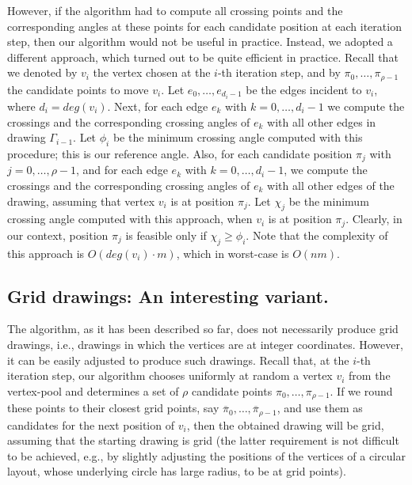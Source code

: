 \documentclass[runningheads]{llncs}
\begin{document}
However, if the algorithm had to compute all crossing points and the corresponding angles at these points for each candidate position at each iteration step, then our algorithm would not be useful in practice. Instead, we adopted a different approach, which turned out to be quite efficient in practice. Recall that we denoted by $v_i$ the vertex chosen at the $i$-th iteration step, and by $\pi_0,\ldots,\pi_{\rho-1}$ the candidate points to move $v_i$. Let $e_0,\ldots,e_{d_i-1}$ be the edges incident to $v_i$, where $d_i=deg(v_i)$. Next, for each edge $e_k$ with $k=0,\ldots,d_i-1$  we compute the crossings and the corresponding crossing angles of $e_k$ with all other edges in drawing $\Gamma_{i-1}$. Let $\phi_i$ be the minimum crossing angle computed with this procedure; this is our reference angle. Also, for each candidate position $\pi_j$ with $j=0,\ldots,\rho-1$, and for each edge $e_k$ with $k=0,\ldots,d_i-1$, we compute the crossings and the corresponding crossing angles of $e_k$ with all other edges of the drawing, assuming that vertex $v_i$ is at position $\pi_j$. Let $\chi_j$ be the minimum crossing angle computed with this approach, when $v_i$ is at position $\pi_j$. Clearly, in our context, position $\pi_j$ is feasible only if $\chi_j \geq \phi_i$. Note that the complexity of this approach is $O(deg(v_i) \cdot m)$, which in worst-case is $O(nm)$. 

\subsection{Grid drawings: An interesting variant.}
\label{ssec:grid}

The algorithm, as it has been described so far, does not necessarily produce grid drawings, i.e., drawings in which the vertices are at integer coordinates. However, it can be easily adjusted to produce such drawings. Recall that, at the $i$-th iteration step, our algorithm chooses uniformly at random a vertex $v_i$ from the vertex-pool and determines a set of $\rho$ candidate points $\pi_0,\ldots,\pi_{\rho-1}$. If we round these points to their closest grid points, say $\overline{\pi}_0,\ldots,\overline{\pi}_{\rho-1}$, and use them as candidates for the next position of $v_i$, then the obtained drawing will be grid, assuming that the starting drawing is grid (the latter requirement is not difficult to be achieved, e.g., by slightly adjusting the positions of the vertices of a circular layout, whose underlying circle has large radius, to be at grid points). 
\end{document}
